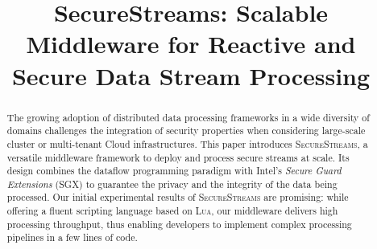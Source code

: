 \documentclass{sig-alternate}
\newcommand{\SYS}{\textsc{SecureStreams}\xspace}
\begin{document}
\title{SecureStreams: Scalable Middleware for Reactive and Secure Data Stream Processing}
\date{}

\author{
}

\maketitle


\begin{abstract}
The growing adoption of distributed data processing frameworks in a wide diversity of domains challenges the integration of security properties when considering large-scale cluster or multi-tenant Cloud infrastructures.
This paper introduces \SYS{}, a versatile middleware framework to deploy and process secure streams at scale.
Its design combines the dataflow programming paradigm with Intel's \emph{Secure Guard Extensions} (SGX) to guarantee the privacy and the integrity of the data being processed.
Our initial experimental results of \SYS{} are promising: while offering a fluent scripting language based on \textsc{Lua}, our middleware delivers high processing throughput, thus enabling developers to implement complex processing pipelines in a few lines of code.
\end{abstract}




















%
{
\footnotesize


}
\end{document}
